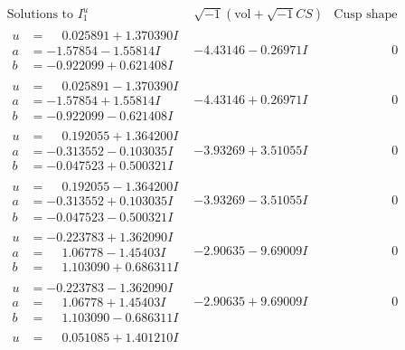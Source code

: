 \documentclass[1p]{elsarticle_modified}
\theoremstyle{definition}
\newcommand{\I}{\sqrt{-1}}
\begin{document}
$$\begin{array}{c|c|c}
\text{Solutions to }I^u_{1}& \I (\text{vol} + \sqrt{-1}CS) & \text{Cusp shape}\\
 \hline 
\begin{aligned}
u &= \phantom{-}0.025891 + 1.370390 I \\
a &= -1.57854 - 1.55814 I \\
b &= -0.922099 + 0.621408 I\end{aligned}
 & -4.43146 - 0.26971 I & \phantom{-0.000000 } 0 \\ \hline\begin{aligned}
u &= \phantom{-}0.025891 - 1.370390 I \\
a &= -1.57854 + 1.55814 I \\
b &= -0.922099 - 0.621408 I\end{aligned}
 & -4.43146 + 0.26971 I & \phantom{-0.000000 } 0 \\ \hline\begin{aligned}
u &= \phantom{-}0.192055 + 1.364200 I \\
a &= -0.313552 - 0.103035 I \\
b &= -0.047523 + 0.500321 I\end{aligned}
 & -3.93269 + 3.51055 I & \phantom{-0.000000 } 0 \\ \hline\begin{aligned}
u &= \phantom{-}0.192055 - 1.364200 I \\
a &= -0.313552 + 0.103035 I \\
b &= -0.047523 - 0.500321 I\end{aligned}
 & -3.93269 - 3.51055 I & \phantom{-0.000000 } 0 \\ \hline\begin{aligned}
u &= -0.223783 + 1.362090 I \\
a &= \phantom{-}1.06778 - 1.45403 I \\
b &= \phantom{-}1.103090 + 0.686311 I\end{aligned}
 & -2.90635 - 9.69009 I & \phantom{-0.000000 } 0 \\ \hline\begin{aligned}
u &= -0.223783 - 1.362090 I \\
a &= \phantom{-}1.06778 + 1.45403 I \\
b &= \phantom{-}1.103090 - 0.686311 I\end{aligned}
 & -2.90635 + 9.69009 I & \phantom{-0.000000 } 0 \\ \hline\begin{aligned}
u &= \phantom{-}0.051085 + 1.401210 I \\

\end{aligned}
\end{array}$$
\end{document}
